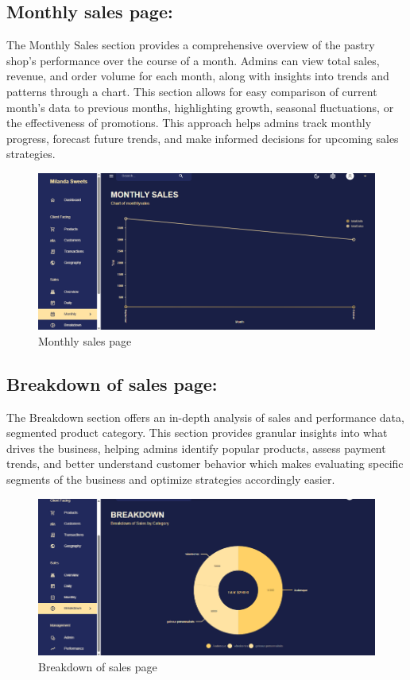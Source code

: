 \subsection{Monthly sales page:}

The Monthly Sales section provides a comprehensive overview of the pastry shop's performance over the course of a month. Admins can view total sales, revenue, and order volume for each month, along with insights into trends and patterns through a chart. This section allows for easy comparison of current month’s data to previous months, highlighting growth, seasonal fluctuations, or the effectiveness of promotions. This approach helps admins track monthly progress, forecast future trends, and make informed decisions for upcoming sales strategies.

\begin{figure}[!h]
\begin{center}
\includegraphics{images/Monthly sales page.png}
\end{center}
\caption{Monthly sales page}
\end{figure}

\subsection{Breakdown of sales page:}

The Breakdown section offers an in-depth analysis of sales and performance data, segmented product category. This section provides granular insights into what drives the business, helping admins identify popular products, assess payment trends, and better understand customer behavior which makes evaluating specific segments of the business and optimize strategies accordingly easier.

\begin{figure}[!h]
\begin{center}
\includegraphics{images/Breakdown of sales page.png}
\end{center}
\caption{Breakdown of sales page}
\end{figure}

